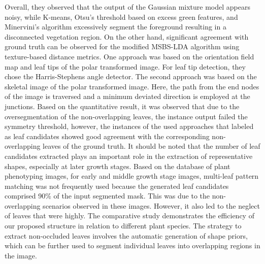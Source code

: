 Overall, they observed that the output of the Gaussian mixture model appears noisy, while K-means, Otsu's threshold based on excess green features,
and Minervini's algorithm excessively segment the foreground resulting in a disconnected vegetation region. On the other hand, significant agreement
with ground truth can be observed for the modified MSBS-LDA algorithm using texture-based distance metrics. One approach was based on the orientation
field map and leaf tips of the polar transformed image. For leaf tip detection, they chose the Harris-Stephens angle detector. The second approach was
based on the skeletal image of the polar transformed image. Here, the path from the end nodes of the image is traversed and a minimum deviated direction
is employed at the junctions. Based on the quantitative result, it was observed that due to the oversegmentation of the non-overlapping leaves, the instance
output failed the symmetry threshold, however, the instances of the used approaches that labeled as leaf candidates showed good agreement with the corresponding
non-overlapping leaves of the ground truth. It should be noted that the number of leaf candidates extracted plays an important role in the extraction of
representative shapes, especially at later growth stages. Based on the database of plant phenotyping images, for early and middle growth stage images,
multi-leaf pattern matching was not frequently used because the generated leaf candidates comprised 90\% of the input segmented mask. This was due to the
non-overlapping scenarios observed in these images. However, it also led to the neglect of leaves that were highly. The comparative study demonstrates the
efficiency of our proposed structure in relation to different plant species. The strategy to extract non-occluded leaves involves the automatic generation
of shape priors, which can be further used to segment individual leaves into overlapping regions in the image.

